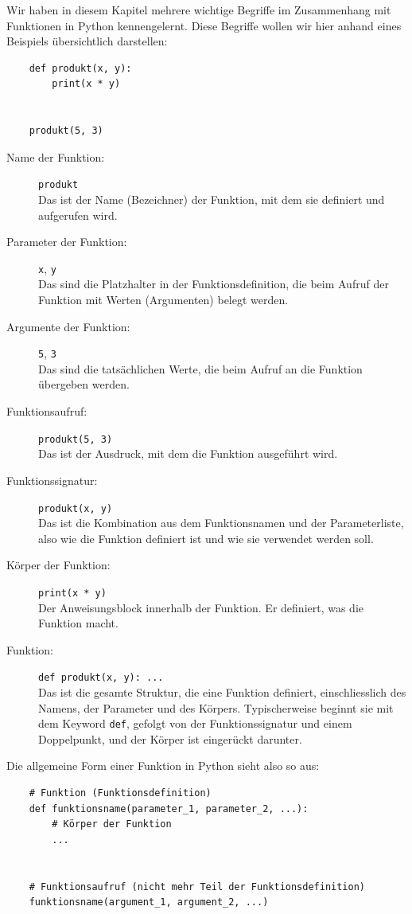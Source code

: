 \begin{myoverview}\label{myoverview:NomenklaturFunktion}
	Wir haben in diesem Kapitel mehrere wichtige Begriffe im Zusammenhang mit Funktionen in Python kennengelernt. Diese Begriffe wollen wir hier anhand eines Beispiels übersichtlich darstellen:
	\begin{lstlisting}
    def produkt(x, y):
        print(x * y)


    produkt(5, 3)
    \end{lstlisting}
	\bigskip
	\begin{description}
		\item[Name der Funktion:] \lstinline|produkt|\\
		      Das ist der Name (Bezeichner) der Funktion, mit dem sie definiert und aufgerufen wird.
		\item[Parameter der Funktion:] \lstinline|x|, \lstinline|y|\\
		      Das sind die Platzhalter in der Funktionsdefinition, die beim Aufruf der Funktion mit Werten (Argumenten) belegt werden.
		\item[Argumente der Funktion:] \lstinline|5|, \lstinline|3|\\
		      Das sind die tatsächlichen Werte, die beim Aufruf an die Funktion übergeben werden.
		\item[Funktionsaufruf:] \lstinline|produkt(5, 3)|\\
		      Das ist der Ausdruck, mit dem die Funktion ausgeführt wird.
		\item[Funktionssignatur:] \lstinline|produkt(x, y)|\\
		      Das ist die Kombination aus dem Funktionsnamen und der Parameterliste, also wie die Funktion definiert ist und wie sie verwendet werden soll.
		\item[Körper der Funktion:] \lstinline|print(x * y)|\\
		      Der Anweisungsblock innerhalb der Funktion. Er definiert, was die Funktion macht.
		\item[Funktion:] \lstinline|def produkt(x, y): ...|\\
		      Das ist die gesamte Struktur, die eine Funktion definiert, einschliesslich des Namens, der Parameter und des Körpers. Typischerweise beginnt sie mit dem Keyword \lstinline|def|, gefolgt von der Funktionssignatur und einem Doppelpunkt, und der Körper ist eingerückt darunter.
	\end{description}

	\medskip
	Die allgemeine Form einer Funktion in Python sieht also so aus:
	\begin{lstlisting}
	# Funktion (Funktionsdefinition)
	def funktionsname(parameter_1, parameter_2, ...):
		# Körper der Funktion
		...
	

	# Funktionsaufruf (nicht mehr Teil der Funktionsdefinition)
	funktionsname(argument_1, argument_2, ...)
	\end{lstlisting}
\end{myoverview}

